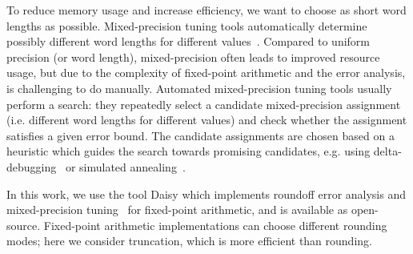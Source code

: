 To reduce memory usage and increase efficiency, we want to choose as short word
lengths as possible. Mixed-precision tuning tools automatically determine possibly different
word lengths for different values~\cite{DaisyTuning,Lee2006}. Compared to uniform precision (or word length),
mixed-precision often leads to improved resource usage, but due to the complexity of
fixed-point arithmetic and the error analysis, is challenging to do manually.  
Automated mixed-precision tuning tools usually perform a search: they repeatedly
select a candidate mixed-precision assignment (i.e. different word lengths for
different values) and check whether the assignment satisfies a given error
bound. The candidate assignments are chosen based on a heuristic which guides
the search towards promising candidates, e.g. using delta-debugging~\cite{DaisyTuning} or
simulated annealing~\cite{Lee2006}.

In this work, we use the tool Daisy which implements roundoff error
analysis and mixed-precision tuning~\cite{DaisyTuning} for fixed-point arithmetic, and is
available as open-source. Fixed-point arithmetic implementations can choose different
rounding modes; here we consider truncation, which is more efficient than
rounding.